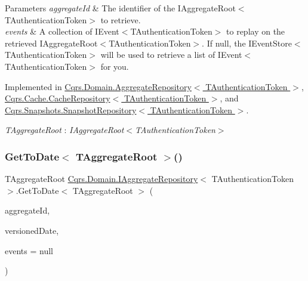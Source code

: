\begin{DoxyParams}{Parameters}
{\em aggregate\+Id} & The identifier of the I\+Aggregate\+Root$<$\+T\+Authentication\+Token$>$ to retrieve.\\
\hline
{\em events} & A collection of I\+Event$<$\+T\+Authentication\+Token$>$ to replay on the retrieved I\+Aggregate\+Root$<$\+T\+Authentication\+Token$>$. If null, the I\+Event\+Store$<$\+T\+Authentication\+Token$>$ will be used to retrieve a list of I\+Event$<$\+T\+Authentication\+Token$>$ for you. \\
\hline
\end{DoxyParams}


Implemented in \hyperlink{classCqrs_1_1Domain_1_1AggregateRepository_a0e55881812d463129df34189d29544b6_a0e55881812d463129df34189d29544b6}{Cqrs.\+Domain.\+Aggregate\+Repository$<$ T\+Authentication\+Token $>$}, \hyperlink{classCqrs_1_1Cache_1_1CacheRepository_a037acba636aedf23ff376ac0b749ec0c_a037acba636aedf23ff376ac0b749ec0c}{Cqrs.\+Cache.\+Cache\+Repository$<$ T\+Authentication\+Token $>$}, and \hyperlink{classCqrs_1_1Snapshots_1_1SnapshotRepository_acdbea47afc87de1da613a6eff3ceef0f_acdbea47afc87de1da613a6eff3ceef0f}{Cqrs.\+Snapshots.\+Snapshot\+Repository$<$ T\+Authentication\+Token $>$}.

\begin{Desc}
\item[Type Constraints]\begin{description}
\item[{\em T\+Aggregate\+Root} : {\em I\+Aggregate\+Root$<$T\+Authentication\+Token$>$}]\end{description}
\end{Desc}
\mbox{\label{interfaceCqrs_1_1Domain_1_1IAggregateRepository_a32308a27ce03c5d406e16b17430dd040_a32308a27ce03c5d406e16b17430dd040}} 
\subsubsection{\texorpdfstring{Get\+To\+Date$<$ T\+Aggregate\+Root $>$()}{GetToDate< TAggregateRoot >()}}
{\footnotesize\ttfamily T\+Aggregate\+Root \hyperlink{interfaceCqrs_1_1Domain_1_1IAggregateRepository}{Cqrs.\+Domain.\+I\+Aggregate\+Repository}$<$ T\+Authentication\+Token $>$.Get\+To\+Date$<$ T\+Aggregate\+Root $>$ (\begin{DoxyParamCaption}\item[{Guid}]{aggregate\+Id,  }\item[{Date\+Time}]{versioned\+Date,  }\item[{I\+List$<$ \hyperlink{interfaceCqrs_1_1Events_1_1IEvent}{I\+Event}$<$ T\+Authentication\+Token $>$$>$}]{events = {\ttfamily null} }\end{DoxyParamCaption})}



